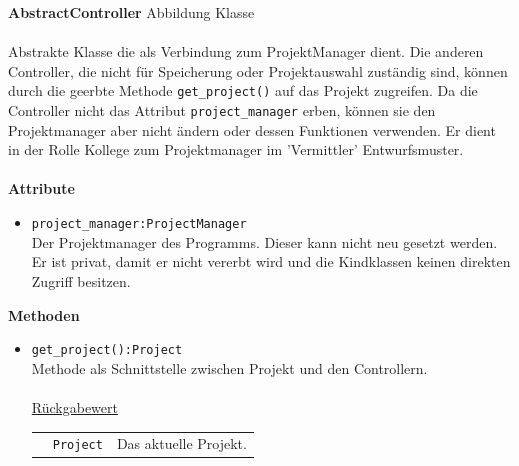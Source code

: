 \documentclass{article}
\begin{document}
\begin{itemize}
\newpage
\textbf{\large{AbstractController}}
\newline\newline
Abbildung Klasse \\\\
Abstrakte Klasse die als Verbindung zum ProjektManager dient. Die anderen Controller, die nicht für Speicherung oder Projektauswahl zuständig sind, können durch die geerbte Methode \texttt{get\_project()} auf das Projekt zugreifen. Da die Controller nicht das Attribut \texttt{project\_manager} erben, können sie den Projektmanager aber nicht ändern oder dessen Funktionen verwenden. Er dient in der Rolle Kollege zum 
Projektmanager im 'Vermittler' Entwurfsmuster.
\\\\
\textbf{\large{Attribute}}
\begin{itemize}
\item \texttt{project\_manager:ProjectManager}\\ Der Projektmanager des Programms. Dieser kann nicht neu gesetzt werden. Er ist privat, damit er nicht vererbt wird und die Kindklassen keinen direkten Zugriff besitzen.
\end{itemize}\leavevmode\newline
\textbf{\large{Methoden}}
\begin{itemize}
\item \texttt{get\_project():Project}\\ Methode als Schnittstelle zwischen Projekt und den Controllern.\\\\
\underline{{Rückgabewert}}\\
\begin{tabular}{lll}
 & \texttt{Project} & Das aktuelle Projekt. \\
\end{tabular}
\end{itemize}




\end{itemize}
\end{document}
